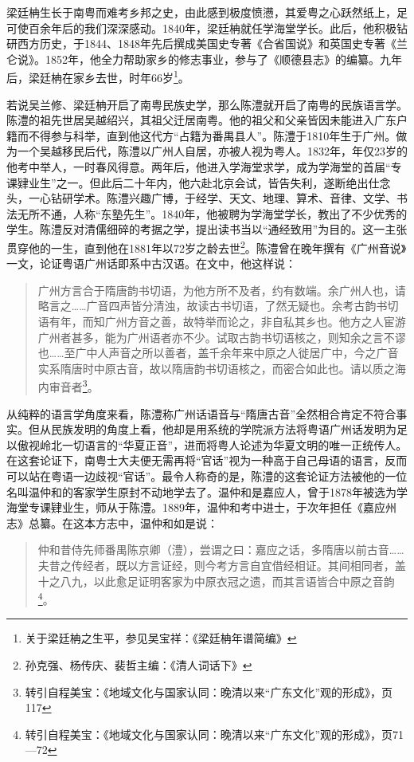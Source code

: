 梁廷柟生长于南粤而难考乡邦之史，由此感到极度愤懑，其爱粤之心跃然纸上，足可使百余年后的我们深深感动。1840年，梁廷柟就任学海堂学长。此后，他积极钻研西方历史，于1844、1848年先后撰成美国史专著《合省国说》和英国史专著《兰仑说》。1852年，他全力帮助家乡的修志事业，参与了《顺德县志》的编纂。九年后，梁廷柟在家乡去世，时年66岁\footnote{关于梁廷柟之生平，参见吴宝祥：《梁廷柟年谱简编》}。

若说吴兰修、梁廷柟开启了南粤民族史学，那么陈澧就开启了南粤的民族语言学。陈澧的祖先世居吴越绍兴，其祖父迁居南粤。他的祖父和父亲皆因未能进入广东户籍而不得参与科举，直到他这代方“占籍为番禺县人”。陈澧于1810年生于广州。做为一个吴越移民后代，陈澧以广州人自居，亦被人视为粤人。1832年，年仅23岁的他考中举人，一时春风得意。两年后，他进入学海堂求学，成为学海堂的首届“专课肄业生”之一。但此后二十年内，他六赴北京会试，皆告失利，遂断绝出仕念头，一心钻研学术。陈澧兴趣广博，于经学、天文、地理、算术、音律、文学、书法无所不通，人称“东塾先生”。1840年，他被聘为学海堂学长，教出了不少优秀的学生。陈澧反对清儒细碎的考据之学，提出读书当以“通经致用”为目的。这一主张贯穿他的一生，直到他在1881年以72岁之龄去世\footnote{孙克强、杨传庆、裴哲主编：《清人词话下》}。陈澧曾在晚年撰有《广州音说》一文，论证粤语广州话即系中古汉语。在文中，他这样说：

\begin{quote}
广州方言合于隋唐韵书切语，为他方所不及者，约有数端。余广州人也，请略言之……广音四声皆分清浊，故读古书切语，了然无疑也。余考古韵书切语有年，而知广州方音之善，故特举而论之，非自私其乡也。他方之人宦游广州者甚多，能为广州语者亦不少。试取古韵书切语核之，则知余之言不谬也……至广中人声音之所以善者，盖千余年来中原之人徙居广中，今之广音实系隋唐时中原古音，故以隋唐韵书切语核之，而密合如此也。请以质之海内审音者\footnote{转引自程美宝：《地域文化与国家认同：晚清以来“广东文化”观的形成》，页117}。
\end{quote}

从纯粹的语言学角度来看，陈澧称广州话语音与“隋唐古音”全然相合肯定不符合事实。但从民族发明的角度上看，他却是用系统的学院派方法将粤语广州话发明为足以傲视岭北一切语言的“华夏正音”，进而将粤人论述为华夏文明的唯一正统传人。在这套论证下，南粤士大夫便无需再将“官话”视为一种高于自己母语的语言，反而可以站在粤语一边歧视“官话”。最令人称奇的是，陈澧的这套论证方法被他的一位名叫温仲和的客家学生原封不动地学去了。温仲和是嘉应人，曾于1878年被选为学海堂专课肄业生，师从于陈澧。1889年，温仲和考中进士，于次年担任《嘉应州志》总纂。在这本方志中，温仲和如是说：

\begin{quote}
仲和昔侍先师番禺陈京卿（澧），尝谓之曰：嘉应之话，多隋唐以前古音……夫昔之传经者，既以方言证经，则今考方言自宜借经相证。其间相同者，盖十之八九，以此愈足证明客家为中原衣冠之遗，而其言语皆合中原之音韵\footnote{转引自程美宝：《地域文化与国家认同：晚清以来“广东文化”观的形成》，页71—72}。
\end{quote}

